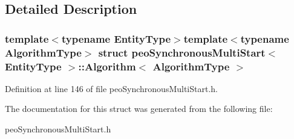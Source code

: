 \subsection{Detailed Description}
\subsubsection*{template$<$typename Entity\-Type$>$template$<$typename Algorithm\-Type$>$ struct peo\-Synchronous\-Multi\-Start$<$ Entity\-Type $>$::Algorithm$<$ Algorithm\-Type $>$}





Definition at line 146 of file peo\-Synchronous\-Multi\-Start.h.

The documentation for this struct was generated from the following file:\begin{CompactItemize}
\item 
peo\-Synchronous\-Multi\-Start.h\end{CompactItemize}

